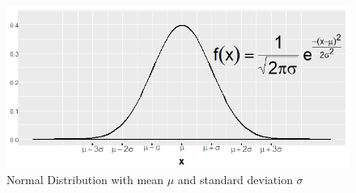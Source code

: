 \documentclass[a4paper, 12pt,twoside]{book}
\begin{document}
\begin{figure}[H]
\centering
\includegraphics[scale=0.6]{NormalDistribution.png}
\caption{Normal Distribution with mean $\mu$ and standard deviation $\sigma$}
\label{NormalDistribution}
\end{figure}
\end{document}
